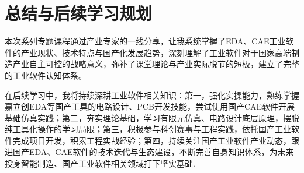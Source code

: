 \documentclass[12pt,a4paper]{article}
\begin{document}
\section{总结与后续学习规划}
本次系列专题课程通过产业专家的一线分享，让我系统掌握了EDA、CAE工业软件的产业现状、技术特点与国产化发展趋势，深刻理解了工业软件对于国家高端制造产业自主可控的战略意义，弥补了课堂理论与产业实际脱节的短板，建立了完整的工业软件认知体系。

在后续学习中，我将持续深耕工业软件相关知识：第一，强化实操能力，熟练掌握嘉立创EDA等国产工具的电路设计、PCB开发技能，尝试使用国产CAE软件开展基础仿真实践；第二，夯实理论基础，学习有限元仿真、电路设计底层原理，摆脱纯工具化操作的学习局限；第三，积极参与科创赛事与工程实践，依托国产工业软件完成项目开发，积累工程实战经验；第四，持续关注国产工业软件产业动态，跟进国产EDA、CAE软件的技术迭代与生态建设，不断完善自身知识体系，为未来投身智能制造、国产工业软件相关领域打下坚实基础.
\end{document}
